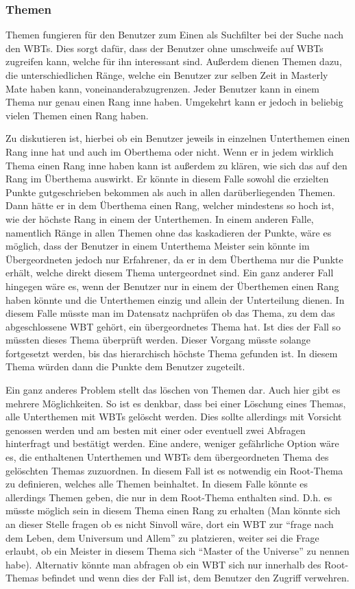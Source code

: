 \subsubsection{Themen}
Themen fungieren für den Benutzer zum Einen als Suchfilter bei der Suche nach
den WBTs. Dies sorgt dafür, dass der Benutzer ohne umschweife auf WBTs zugreifen
kann, welche für ihn interessant sind. Außerdem dienen Themen dazu, die
unterschiedlichen Ränge, welche ein Benutzer zur selben Zeit in Masterly Mate
haben kann, voneinanderabzugrenzen. Jeder Benutzer kann in einem Thema nur genau
einen Rang inne haben. Umgekehrt kann er jedoch in beliebig vielen Themen einen
Rang haben.

Zu diskutieren ist, hierbei ob ein Benutzer jeweils in einzelnen Unterthemen
einen Rang inne hat und auch im Oberthema oder nicht. Wenn er in jedem wirklich
Thema einen Rang inne haben kann ist außerdem zu klären, wie sich das auf den
Rang im Überthema auswirkt. Er könnte in diesem Falle sowohl die erzielten
Punkte gutgeschrieben bekommen als auch in allen darüberliegenden Themen. Dann
hätte er in dem Überthema einen Rang, welcher mindestens so hoch ist, wie der
höchste Rang in einem der Unterthemen. 
In einem anderen Falle, namentlich Ränge in allen Themen ohne das kaskadieren
der Punkte, wäre es möglich, dass der Benutzer in einem Unterthema Meister sein
könnte im Übergeordneten jedoch nur Erfahrener, da er in dem Überthema nur die
Punkte erhält, welche direkt diesem Thema untergeordnet sind.
Ein ganz anderer Fall hingegen wäre es, wenn der Benutzer nur in einem der
Überthemen einen Rang haben könnte und die Unterthemen einzig und allein der
Unterteilung dienen. In diesem Falle müsste man im Datensatz nachprüfen ob das
Thema, zu dem das abgeschlossene WBT gehört, ein übergeordnetes Thema hat. Ist
dies der Fall so müssten dieses Thema überprüft werden. Dieser Vorgang müsste
solange fortgesetzt werden, bis das hierarchisch höchste Thema gefunden ist.
In diesem Thema würden dann die Punkte dem Benutzer zugeteilt.

Ein ganz anderes Problem stellt das löschen von Themen dar. Auch hier gibt es
mehrere Möglichkeiten. So ist es denkbar, dass bei einer Löschung eines Themas,
alle Unterthemen mit WBTs gelöscht werden. Dies sollte allerdings mit Vorsicht
genossen werden und am besten mit einer oder eventuell zwei Abfragen hinterfragt
und bestätigt werden.
Eine andere, weniger gefährliche Option wäre es, die enthaltenen Unterthemen und
WBTs dem übergeordneten Thema des gelöschten Themas zuzuordnen. In diesem Fall
ist es notwendig ein Root-Thema zu definieren, welches alle Themen beinhaltet.
In diesem Falle könnte es allerdings Themen geben, die nur in dem Root-Thema
enthalten sind. D.h. es müsste möglich sein in diesem Thema einen Rang
zu erhalten (Man könnte sich an dieser Stelle fragen ob es nicht Sinvoll wäre,
dort ein WBT zur "`frage nach dem Leben, dem Universum und Allem"' zu
platzieren, weiter sei die Frage erlaubt, ob ein Meister in diesem Thema sich
``Master of the Universe'' zu nennen habe). Alternativ könnte man abfragen ob
ein WBT sich nur innerhalb des Root-Themas befindet und wenn dies der Fall ist,
dem Benutzer den Zugriff verwehren.  

